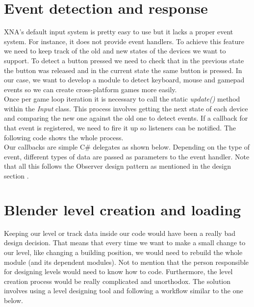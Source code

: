 

\section{Event detection and response}

XNA's default input system is pretty easy to use but it lacks a proper event
system. For instance, it does not provide event handlers.
To achieve this feature we need to keep track
of the old and new states of the devices we want to support. To detect a button pressed
we need to check that in the previous state the button was released and in the current
state the same button is pressed. In our case, we want to develop a module to
detect keyboard, mouse and gamepad events so we can create cross-platform games
more easily.\\

Once per game loop iteration it is necessary to call the static \textit{update()}
method within the \textit{Input} class. This process involves getting the next state of
each device and comparing the new one against the old one to detect events. If a
callback for that event is registered, we need to fire it up so listeners can be notified.
The following code shows the whole process.\\



Our callbacks are simple C\# delegates as shown below. Depending on the type of event,
different types of data are passed as parameters to the event handler. Note that all
this follows the Observer design pattern as mentioned in the design section \cite{gamm94}.\\



\section{Blender level creation and loading}

Keeping our level or track data inside our code would have been a really bad design decision.
That means that every time we want to make a small change to our level, like changing
a building position, we would need to rebuild the whole module (and its dependent modules).
Not to mention that the person responsible for designing levels would need to know how to code.
Furthermore, the level creation process would be really complicated and unorthodox. The solution
involves using a level designing tool and following a workflow similar to the one below.

